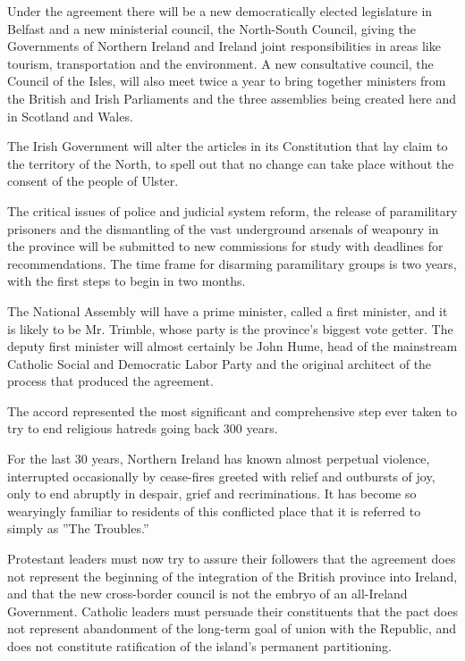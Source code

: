 Under the agreement there will be a new democratically elected
legislature in Belfast and a new ministerial council, the North-South
Council, giving the Governments of Northern Ireland and Ireland joint
responsibilities in areas like tourism, transportation and the
environment. A new consultative council, the Council of the Isles, will
also meet twice a year to bring together ministers from the British and
Irish Parliaments and the three assemblies being created here and in
Scotland and Wales.

The Irish Government will alter the articles in its Constitution that
lay claim to the territory of the North, to spell out that no change can
take place without the consent of the people of Ulster.

The critical issues of police and judicial system reform, the release of
paramilitary prisoners and the dismantling of the vast underground
arsenals of weaponry in the province will be submitted to new
commissions for study with deadlines for recommendations. The time frame
for disarming paramilitary groups is two years, with the first steps to
begin in two months.

The National Assembly will have a prime minister, called a first
minister, and it is likely to be Mr. Trimble, whose party is the
province's biggest vote getter. The deputy first minister will almost
certainly be John Hume, head of the mainstream Catholic Social and
Democratic Labor Party and the original architect of the process that
produced the agreement.

The accord represented the most significant and comprehensive step ever
taken to try to end religious hatreds going back 300 years.

For the last 30 years, Northern Ireland has known almost perpetual
violence, interrupted occasionally by cease-fires greeted with relief
and outbursts of joy, only to end abruptly in despair, grief and
recriminations. It has become so wearyingly familiar to residents of
this conflicted place that it is referred to simply as ''The Troubles.''

Protestant leaders must now try to assure their followers that the
agreement does not represent the beginning of the integration of the
British province into Ireland, and that the new cross-border council is
not the embryo of an all-Ireland Government. Catholic leaders must
persuade their constituents that the pact does not represent abandonment
of the long-term goal of union with the Republic, and does not
constitute ratification of the island's permanent partitioning.

